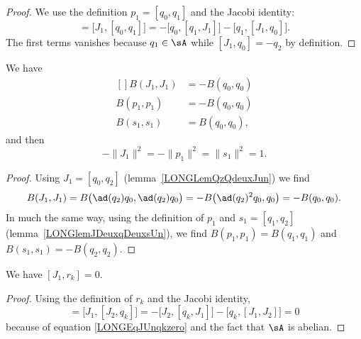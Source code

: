 \begin{proof}
	We use the definition $p_1=[q_0,q_1]$ and the Jacobi identity:
	\begin{equation}
		[J_1,p_1]=\big[ J_1,[q_0,q_1] \big]=-\big[ q_0,[q_1,J_1] \big]-\big[ q_1,[J_1,q_0] \big].
	\end{equation}
	The first terms vanishes because $q_1\in\sA$ while $[J_1,q_0]=-q_2$ by definition.
\end{proof}

\begin{proposition}		\label{LONGPropBJpsun}
	We have
	\begin{equation}
		\begin{aligned}[]
			B(J_1,J_1)&=-B(q_0,q_0)\\
			B(p_1,p_1)&=-B(q_0,q_0)\\
			B(s_1,s_1)&=B(q_0,q_0),
		\end{aligned}
	\end{equation}
	and then
	\begin{equation}
		-\| J_1 \|^2=-\| p_1 \|^2=\| s_1 \|^2=1.
	\end{equation}
\end{proposition}

\begin{proof}
	Using $J_1=[q_0,q_2]$ (lemma~\ref{LONGLemQzQdeuxJun}) we find
	\begin{equation}
		B(J_1,J_1)=B\big( \ad(q_2)q_0,\ad(q_2)q_0 \big)=-B\big( \ad(q_2)^2q_0,q_0 \big)=-B(q_0,q_0).
	\end{equation}
	In much the same way, using the definition of $p_1$ and $s_1=[q_1,q_2]$ (lemma~\ref{LONGlemJDeuxqDeuxsUn}), we find $B(p_1,p_1)=B(q_1,q_1)$ and $B(s_1,s_1)=-B(q_2,q_2)$.

\end{proof}

\begin{lemma}		\label{LONGLemJunrkzero}
	We have $[J_1,r_k]=0$.
\end{lemma}

\begin{proof}
	Using the definition of $r_k$ and the Jacobi identity,
	\begin{equation}
		[J_1,r_k]= \big[ J_1,[J_2,q_k] \big]=-\big[ J_2,[q_k,J_1] \big]-\big[ q_k,[J_1,J_2] \big]=0
	\end{equation}
	because of equation \eqref{LONGEqJUnqkzero} and the fact that $\sA$ is abelian.
\end{proof}

